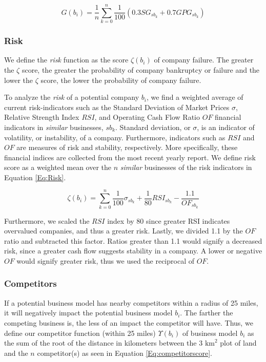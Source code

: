 \documentclass{mcmthesis}
\begin{document}
\begin{equation}
    G(b_i) = \frac{1}{n} \sum_{k=0}^n \frac{1}{100} \left( 0.3 SG_{sb_k} + 0.7 GPG_{sb_k} \right)
    \label{Eq:growthscore}
\end{equation}

\subsubsection{Risk}
We define the \textit{risk} function as the score $\zeta(b_i)$ of company failure. The greater the $\zeta$ score, the greater the probability of company bankruptcy or failure and the lower the $\zeta$ score, the lower the probability of company failure. 

To analyze the \textit{risk} of a potential company $b_i$, we find a weighted average of current risk-indicators such as the Standard Deviation of Market Prices $\sigma$, Relative Strength Index $RSI$, and Operating Cash Flow Ratio $OF$ financial indicators in \textit{similar} businesses, $sb_k$. Standard deviation, or $\sigma$, is an indicator of volatility, or instability, of a company. Furthermore, indicators such as $RSI$ and $OF$ are measures of risk and stability, respectively. More specifically, these financial indices are collected from the most recent yearly report. We define risk score as a weighted mean over the $n$ \textit{similar} businesses of the risk indicators in Equation \ref{Eq:Risk}. 

\begin{equation}
    \zeta(b_i) = \sum_{k=0}^{n} \frac{1}{100} \sigma_{sb_k} + \frac{1}{80} RSI_{sb_k} - \frac{1.1}{OF_{sb_k}}
    \label{Eq:Risk}
\end{equation}

Furthermore, we scaled the $RSI$ index by 80 since greater RSI indicates overvalued companies, and thus a greater risk. Lastly, we divided 1.1 by the $OF$ ratio and subtracted this factor. Ratios greater than 1.1 would signify a decreased risk, since a greater cash flow suggests stability in a company. A lower or negative $OF$ would signify greater risk, thus we used the reciprocal of $OF$. 

\subsubsection{Competitors}
If a potential business model has nearby competitors within a radius of 25 miles, it will negatively impact the potential business model $b_i$. The farther the competing business is, the less of an impact the competitor will have. Thus, we define our competitor function (within 25 miles) $\Upsilon(b_i)$ of business model $b_i$ as the sum of the root of the distance in kilometers between the 3 $\text{km}^2$ plot of land and the $n$ competitor(s) as seen in Equation \ref{Eq:competitorscore}. 
\end{document}
